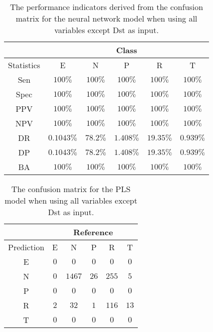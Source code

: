 \begin{table}[!ht]
	\centering
	\begin{tabular}{|c|c|c|c|c|c|}
		\hline
		 & \multicolumn{5}{c|}{Class} \\ \hline
		Statistics & E & N & P & R & T \\ \hline
		Sen & $100\%$ & $100\%$ & $100\%$ & $100\%$ & $100\%$ \\ \hline
		Spec & $100\%$ & $100\%$ & $100\%$ & $100\%$ & $100\%$ \\ \hline
		PPV & $100\%$ & $100\%$ & $100\%$ & $100\%$ & $100\%$ \\ \hline
		NPV & $100\%$ & $100\%$ & $100\%$ & $100\%$ & $100\%$ \\ \hline
		DR & $0.1043\%$ & $78.2\%$ & $1.408\%$ & $19.35\%$ & $0.939\%$ \\ \hline
		DP & $0.1043\%$ & $78.2\%$ & $1.408\%$ & $19.35\%$ & $0.939\%$ \\ \hline
		BA & $100\%$ & $100\%$ & $100\%$ & $100\%$ & $100\%$ \\ \hline
	\end{tabular}
	\caption{The performance indicators derived from the confusion matrix for the neural network model when using all variables except Dst as input.}
	\label{tab:cs:reverse:noDst:nnet}
\end{table}

\begin{table}[!ht]
	\centering
	\begin{tabular}{|c|c|c|c|c|c|}
		\hline
		 & \multicolumn{5}{|c|}{Reference} \\ \hline
		 Prediction & E & N & P & R & T \\ \hline
		 E & $0$ & $0$ & $0$ & $0$ & $0$ \\ \hline
		 N & $0$ & $1467$ & $26$ & $255$ & $5$ \\ \hline
		 P & $0$ & $0$ & $0$ & $0$ & $0$ \\ \hline
		 R & $2$ & $32$ & $1$ & $116$ & $13$ \\ \hline
		 T & $0$ & $0$ & $0$ & $0$ & $0$ \\ \hline
	\end{tabular}
	\caption{The confusion matrix for the PLS model when using all variables except Dst as input.}
	\label{tab:cm:noDst:pls}
\end{table}

